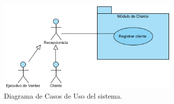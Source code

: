 

	\begin{figure}[htbp!]
		\centering
			\includegraphics[width=0.8\textwidth]{images/RegistrarCliente}
		\caption{Diagrama de Casos de Uso del sistema.}
	\end{figure}


